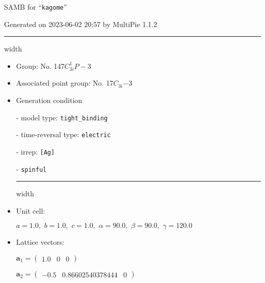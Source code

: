 \documentclass[fleqn,10pt,landscape]{article}
\begin{document}
\setcounter{MaxMatrixCols}{16}

\setlength{\baselineskip}{16pt}
\footnotesize
\begin{center}
\LARGE
SAMB for ``\texttt{kagome}''
\end{center}
\begin{flushright}
Generated on 2023-06-02 20:57 by MultiPie 1.1.2
\end{flushright}
\vspace{1cm}


 \hfil \hrule height 1mm width \textwidth \hfil

\begin{itemize}
\item Group: No. 147\quad$C_{3i}^{1}$\quad$P-3$\quad[ trigonal ]

\item Associated point group: No. 17\quad$C_{3i}$\quad$-3$\quad[ trigonal ]

\vspace{5mm}

\item Generation condition

\quad - model type: \texttt{tight_binding}

\quad - time-reversal type: \texttt{electric}

\quad - irrep: \texttt{[Ag]}

\quad - \texttt{spinful}


 \hfil \hrule height 1mm width \textwidth \hfil

\item Unit cell:

\quad $a=1.0,\,\, b=1.0,\,\, c=1.0,\,\, \alpha=90.0,\,\, \beta=90.0,\,\, \gamma=120.0$

\item Lattice vectors:

\quad $\bm{a}_1=\begin{pmatrix} 1.0 & 0 & 0 \end{pmatrix}$

\quad $\bm{a}_2=\begin{pmatrix} -0.5 & 0.86602540378444 & 0 \end{pmatrix}$


\end{itemize}
\end{document}
